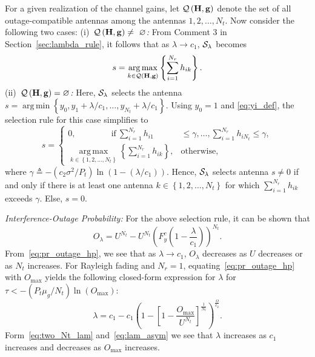 \documentclass[journal]{IEEEtran}
\newcommand{\define}{\triangleq}
\newcommand{\tendsto}{\to}
\newcommand{\mtx}[1]{{\bf #1}} %
\DeclareMathOperator*{\argmin}{arg\,min}
\DeclareMathOperator*{\argmax}{arg\,max}
\newcommand{\lam}{\lambda}
\newcommand{\mug}{{\mu_{g}}}
\newcommand{\goodset}{\cal{Q\left(\Hmx,\g \right) }}
\newcommand{\Nt}{{N_t}}
\newcommand{\Nr}{{N_r}}
\newcommand{\Pt}{{P_t}}
\newcommand{\such}{h}
\newcommand{\puch}{g}
\newcommand{\hk}[1]{{\such_{#1}}}
\newcommand{\g}{\mathbf{\puch}}
\newcommand{\noisevar}{\sigma^2}
\newcommand{\outmax}{O_{\text{max}}}
\newcommand{\itau}{\tau}
\newcommand{\cone}{c_{1}}
\newcommand{\ctwo}{c_{2}}
\newcommand{\out}{O}
\newcommand{\lambycone}{\frac{\lam}{\cone}}
\newcommand{\lambyconeinl}{\lam/\cone}
\newcommand{\yk}[1]{y_{#1}}
\newcommand{\al}{\ctwo}
\newcommand{\snr}{\Omega}
\newcommand{\snrbyal}[1][]{\frac{\snr#1}{\al}}
\newcommand{\un}{U}
\newcommand{\antopts}{\left\{1,2,\ldots,\Nt\right\}}
\newcommand{\igammainline}{{- \left( {\al\noisevar}/{\Pt}\right)  \ln\left({1-\left( \lambyconeinl\right)  }\right) }}
\newcommand{\Hmx}{\mtx{H}}
\newcommand{\callamrule}{{\cal S_{{\lam}}}}
\newcommand{\outlam}{\out_{\lam}}
\newcommand{\nullset}{\varnothing}
\newcommand{\ccdfyrv}[1]{ F^{c}_{y}\left(#1 \right) }
\newcommand{\sumnr}{\sum_{i=1}^{\Nr}}
\newcommand{\gammath}{\gamma}
\begin{document}
For a given realization of the channel gains, let $\goodset$ denote the set of all outage-compatible antennas among the antennas $1,2,\ldots,\Nt$. Now consider the following two cases: (i)~{\em $\goodset\neq~\nullset$:} From Comment 3 in Section~\ref{sec:lambda_rule}, it follows that as $\lam \tendsto \cone$, $\callamrule$ becomes 
%
\begin{equation}
\label{eq:hp_rule_G_not_empty}
s = \argmax_{k\in\goodset}\left\lbrace \sumnr \hk{ik}\right\rbrace. 
\end{equation}
%
(ii)~{\em $\goodset= \nullset$:} Here, $\callamrule$ selects the antenna $s = \argmin\left\lbrace  \yk{0},\yk{1}+\lambyconeinl,\ldots,\yk{\Nt}+\lambyconeinl \right\rbrace$. Using $\yk{0}=1$ and \eqref{eq:yi_def}, the selection rule for this case simplifies  to  
\begin{equation}
\label{eq:hp_rule_G_empty}
s = \!\left\{\!\!
\begin{array}{ll}
0,  \hspace{50pt}\text{if}~\sumnr\!\hk{i1}\!\!\!&	\!\!\leq \gammath,\ldots, \sumnr\hk{i\Nt}\leq\gammath, \\ 
\argmax\limits_{k\in\antopts}\!\!\left\lbrace \!\sumnr\hk{ik}\!\right\rbrace,\!\! &\text{otherwise},
\end{array}\right.
\end{equation}
where $\gammath\define\igammainline$. Hence, $\callamrule$ selects antenna $s\neq0$ if and only if there is at least one antenna $k\in\antopts$ for which $\sumnr \hk{ik}$ exceeds $\gammath$. Else, $s=0$. 


{\em Interference-Outage Probability:} For the above selection rule, it can be shown that
\begin{equation}
\label{eq:pr_outage_hp}
\outlam = \un^{\Nt} - \un^{\Nt}\left(\ccdfyrv{1-\lambycone} \right)^{\Nt}.
\end{equation}
%
From~\eqref{eq:pr_outage_hp}, we see that as $\lam\tendsto\cone$, $\outlam$ decreases as $\un$ decreases or as $\Nt$ increases. 
For Rayleigh fading and $\Nr=1$, equating~\eqref{eq:pr_outage_hp} with $\outmax$ yields the following closed-form expression for $\lam$ for $\itau<-\left({\Pt\mug}/{\Nt}\right) \ln\left({\outmax}\right)$: 
\begin{equation}
\label{eq:lam_asym}
\lam  =  \cone - \cone\left(1 - \left[1 - \frac{\outmax}{\un^{\Nt}}\right]^{\frac{1}{\Nt}} \right)^{\snrbyal[]}.
\end{equation}
%
Form~\eqref{eq:two_Nt_lam} and~\eqref{eq:lam_asym} we see that $\lam$ increases as $\cone$ increases and  decreases as $\outmax$ increases.
\end{document}
